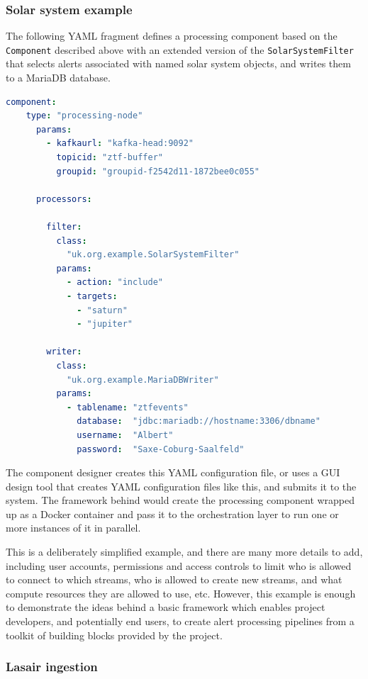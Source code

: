 \documentclass{article}
\newcommand{\yaml} {YAML\xspace}
\newcommand{\docker} {Docker\xspace}
\newcommand{\mariadb} {MariaDB\xspace}
\begin{document}
\subsubsection{Solar system example}
\label{workflow.solar-system}

The following \yaml fragment defines a processing component based on the \texttt{Component} described above with an extended version of the \texttt{SolarSystemFilter} that selects alerts associated with named solar system objects, and writes them to a \mariadb database.

\begin{lstlisting}[language=yaml]
  component:
    type: "processing-node"
      params:
        - kafkaurl: "kafka-head:9092"
          topicid: "ztf-buffer"
          groupid: "groupid-f2542d11-1872bee0c055"

      processors:

        filter:
          class:
            "uk.org.example.SolarSystemFilter"
          params:
            - action: "include"
            - targets:
              - "saturn"
              - "jupiter"

        writer:
          class:
            "uk.org.example.MariaDBWriter"
          params:
            - tablename: "ztfevents"
              database:  "jdbc:mariadb://hostname:3306/dbname"
              username:  "Albert"
              password:  "Saxe-Coburg-Saalfeld"
\end{lstlisting}

The component designer creates this \yaml configuration file, or uses a GUI design tool that creates \yaml configuration files like this, and submits it to the system.
The framework behind would create the processing component wrapped up as a \docker container and pass it to the orchestration layer to run one or more instances of it in parallel.

This is a deliberately simplified example, and there are many more details to add, including user accounts, permissions and access controls to limit who is allowed to connect to which streams, who is allowed to create new streams, and what compute resources they are allowed to use, etc.
However, this example is enough to demonstrate the ideas behind a basic framework which enables project developers, and potentially end users, to create alert processing pipelines from a toolkit of building blocks provided by the project.

\subsubsection{Lasair ingestion}
\label{workflow.lasair-ingestion}
\end{document}
